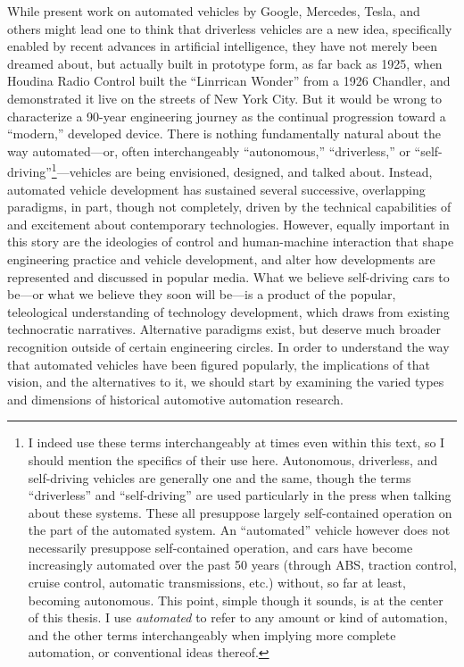 While present work on automated vehicles by Google, Mercedes, Tesla,
and others might lead one to think that driverless vehicles are a
new idea, specifically enabled by recent advances in artificial
intelligence, they have not merely been dreamed about, but actually
built in prototype form, as far back as 1925, when Houdina Radio Control
built the ``Linrrican Wonder'' from a 1926 Chandler, and demonstrated
it live on the streets of New York City. But it would be wrong to
characterize a 90-year engineering journey as the continual
progression toward a ``modern,'' developed device. There is nothing
fundamentally natural about the way automated---or, often interchangeably
``autonomous,'' ``driverless,'' or ``self-driving''\footnote{I indeed use these terms
  interchangeably at times even within this text, so I should mention
the specifics of their use here. Autonomous, driverless, and self-driving
vehicles are generally one and the same, though the terms
``driverless'' and
``self-driving'' are used particularly in the press when talking about
these systems. These all presuppose largely self-contained operation
on the part of the automated system. An ``automated'' vehicle however
does not necessarily presuppose self-contained operation, and cars
have become increasingly automated over the past 50 years (through
ABS, traction control, cruise control, automatic transmissions, etc.) without, so
far at least, becoming autonomous. This point, simple though it
sounds, is at the center of this thesis. I use \emph{automated} to refer to any amount
or kind of automation, and the other terms interchangeably when
implying more complete automation, or conventional ideas thereof.}---vehicles are being
envisioned, designed, and talked about. Instead, automated vehicle
development has sustained several successive, overlapping paradigms,
in part, though not completely, driven by the technical capabilities
of and excitement about contemporary technologies. However, equally
important in this story are the ideologies of control and
human-machine interaction that shape engineering practice and vehicle 
development, and alter how developments are represented and discussed
in popular media. What we believe self-driving cars to be---or what we
believe they soon will be---is a product of the popular, teleological understanding
of technology development, which draws from existing technocratic
narratives. Alternative paradigms exist,
but deserve much broader recognition outside of certain engineering circles. In
order to understand the way that automated vehicles have been figured
popularly, the implications of that vision, and the alternatives to
it, we should start by examining the varied types and dimensions
of historical automotive automation research.

